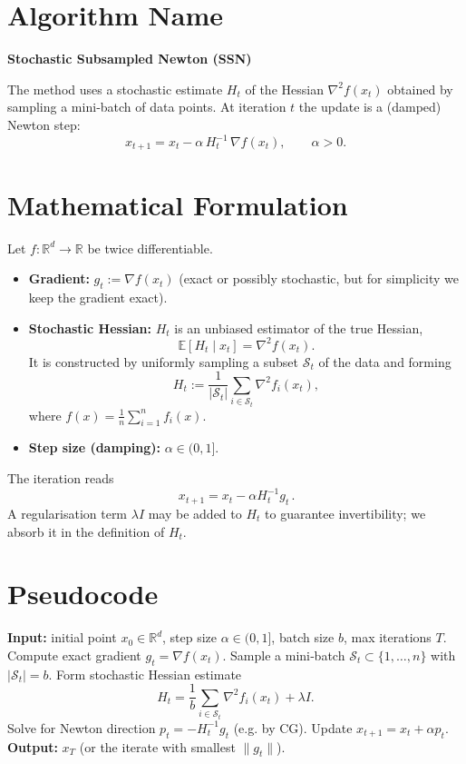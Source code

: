 \documentclass{article}
\newcommand{\E}{\mathbb{E}}
\newcommand{\R}{\mathbb{R}}
\begin{document}
\section*{Algorithm Name}
\textbf{Stochastic Subsampled Newton (SSN)}  

The method uses a stochastic estimate $H_t$ of the Hessian $\nabla^{2}f(x_t)$ obtained by sampling a mini‑batch of data points.  At iteration $t$ the update is a (damped) Newton step:
\[
x_{t+1}=x_t-\alpha\,H_t^{-1}\,\nabla f(x_t),\qquad \alpha>0.
\]

\section*{Mathematical Formulation}
Let $f:\R^{d}\to\R$ be twice differentiable.  
\begin{itemize}
    \item \textbf{Gradient:} $g_t:=\nabla f(x_t)$ (exact or possibly stochastic, but for simplicity we keep the gradient exact).
    \item \textbf{Stochastic Hessian:} $H_t$ is an unbiased estimator of the true Hessian,
    \[
    \E[H_t\mid x_t]=\nabla^{2}f(x_t).
    \]
    It is constructed by uniformly sampling a subset $\mathcal{S}_t$ of the data and forming
    \[
    H_t:=\frac{1}{|\mathcal{S}_t|}\sum_{i\in\mathcal{S}_t}\nabla^{2}f_i(x_t),
    \]
    where $f(x)=\frac{1}{n}\sum_{i=1}^{n}f_i(x)$.
    \item \textbf{Step size (damping):} $\alpha\in(0,1]$.
\end{itemize}
The iteration reads
\begin{equation}
\boxed{\,x_{t+1}=x_t-\alpha H_t^{-1}g_t\,}. \tag{1}
\end{equation}
A regularisation term $\lambda I$ may be added to $H_t$ to guarantee invertibility; we absorb it in the definition of $H_t$.

\section*{Pseudocode}
\begin{algorithm}[H]
\caption{Stochastic Subsampled Newton (SSN)}
\begin{algorithmic}[1]
\State \textbf{Input:} initial point $x_0\in\R^{d}$, step size $\alpha\in(0,1]$, batch size $b$, max iterations $T$.
    \State Compute exact gradient $g_t=\nabla f(x_t)$.
    \State Sample a mini‑batch $\mathcal{S}_t\subset\{1,\dots,n\}$ with $|\mathcal{S}_t|=b$.
    \State Form stochastic Hessian estimate 
    \[
    H_t=\frac{1}{b}\sum_{i\in\mathcal{S}_t}\nabla^{2} f_i(x_t)+\lambda I.
    \]
    \State Solve for Newton direction $p_t= - H_t^{-1}g_t$ (e.g. by CG).
    \State Update $x_{t+1}=x_t+\alpha p_t$.
\EndFor
\State \textbf{Output:} $x_T$ (or the iterate with smallest $\|g_t\|$).
\end{algorithmic}
\end{algorithm}
\end{document}
